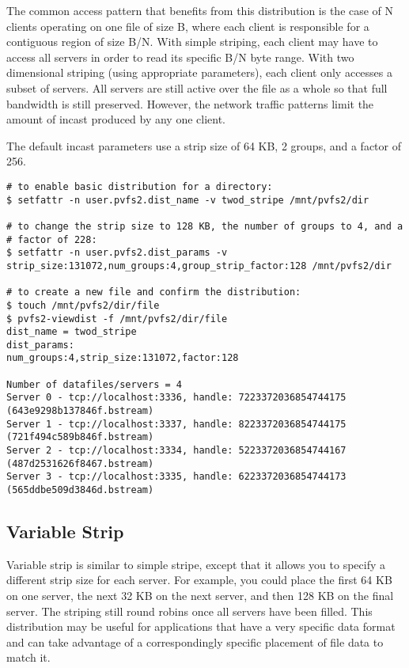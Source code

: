 \documentclass[11pt,letterpaper]{article}
\begin{document}
The common access pattern that benefits from this distribution is the
case of N clients operating on one file of size B, where each client is
responsible for a contiguous region of size B/N.  With simple striping,
each client may have to access all servers in order to read its specific
B/N byte range.  With two dimensional striping (using appropriate
parameters), each client only accesses a subset of servers.  All servers
are still active over the file as a whole so that full bandwidth is
still preserved.  However, the network traffic patterns limit the amount
of incast produced by any one client.

The default incast parameters use a strip size of 64 KB, 2 groups, and a
factor of 256.

\begin{verbatim}
# to enable basic distribution for a directory:
$ setfattr -n user.pvfs2.dist_name -v twod_stripe /mnt/pvfs2/dir

# to change the strip size to 128 KB, the number of groups to 4, and a
# factor of 228:
$ setfattr -n user.pvfs2.dist_params -v strip_size:131072,num_groups:4,group_strip_factor:128 /mnt/pvfs2/dir

# to create a new file and confirm the distribution:
$ touch /mnt/pvfs2/dir/file
$ pvfs2-viewdist -f /mnt/pvfs2/dir/file
dist_name = twod_stripe
dist_params:
num_groups:4,strip_size:131072,factor:128

Number of datafiles/servers = 4
Server 0 - tcp://localhost:3336, handle: 7223372036854744175
(643e9298b137846f.bstream)
Server 1 - tcp://localhost:3337, handle: 8223372036854744175
(721f494c589b846f.bstream)
Server 2 - tcp://localhost:3334, handle: 5223372036854744167
(487d2531626f8467.bstream)
Server 3 - tcp://localhost:3335, handle: 6223372036854744173
(565ddbe509d3846d.bstream)
\end{verbatim}

\subsection{Variable Strip}

Variable strip is similar to simple stripe, except that it allows you to
specify a different strip size for each server.  For example, you could
place the first 64 KB on one server, the next 32 KB on the next server,
and then 128 KB on the final server.  The striping still round robins
once all servers have been filled.  This distribution may be useful for
applications that have a very specific data format and can take
advantage of a correspondingly specific placement of file data to match it.
\end{document}
